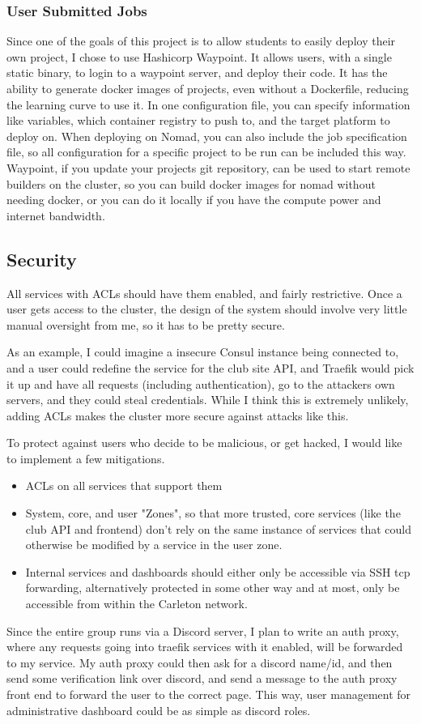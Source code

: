 \documentclass{article}
\begin{document}
\subsubsection{User Submitted Jobs}
Since one of the goals of this project is to allow students to easily deploy their own project, I chose to use Hashicorp Waypoint. It allows users, with a single static binary, to login to a waypoint server, and deploy their code. It has the ability to generate docker images of projects, even without a Dockerfile, reducing the learning curve to use it. In one configuration file, you can specify information like variables, which container registry to push to, and the target platform to deploy on. When deploying on Nomad, you can also include the job specification file, so all configuration for a specific project to be run can be included this way. Waypoint, if you update your projects git repository, can be used to start remote builders on the cluster, so you can build docker images for nomad without needing docker, or you can do it locally if you have the compute power and internet bandwidth.
\subsection{Security}
All services with ACLs should have them enabled, and fairly restrictive. Once a user gets access to the cluster, the design of the system should involve very little manual oversight from me, so it has to be pretty secure.

As an example, I could imagine a insecure Consul instance being connected to, and a user could redefine the service for the club site API, and Traefik would pick it up and have all requests (including authentication), go to the attackers own servers, and they could steal credentials. While I think this is extremely unlikely, adding ACLs makes the cluster more secure against attacks like this.

To protect against users who decide to be malicious, or get hacked, I would like to implement a few mitigations.
\begin{itemize}
    \item ACLs on all services that support them
    \item System, core, and user "Zones", so that more trusted, core services (like the club API and frontend) don't rely on the same instance of services that could otherwise be modified by a service in the user zone.
    \item Internal services and dashboards should either only be accessible via SSH tcp forwarding, alternatively protected in some other way and at most, only be accessible from within the Carleton network.
\end{itemize}
Since the entire group runs via a Discord server, I plan to write an auth proxy, where any requests going into traefik services with it enabled, will be forwarded to my service. My auth proxy could then ask for a discord name/id, and then send some verification link over discord, and send a message to the auth proxy front end to forward the user to the correct page. This way, user management for administrative dashboard could be as simple as discord roles.
\end{document}
